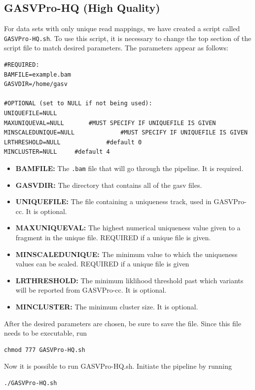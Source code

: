 \documentclass[11pt]{article}
\begin{document}
\subsection{GASVPro-HQ (High Quality)}
For data sets with only unique read mappings, we have created a script called \verb+GASVPro-HQ.sh+. To use this script, it is necessary to change the top section of the script file to match desired parameters. The parameters appear as follows: 
\begin{Verbatim}[frame=single]
#REQUIRED:
BAMFILE=example.bam
GASVDIR=/home/gasv

#OPTIONAL (set to NULL if not being used):
UNIQUEFILE=NULL
MAXUNIQUEVAL=NULL		#MUST SPECIFY IF UNIQUEFILE IS GIVEN
MINSCALEDUNIQUE=NULL             #MUST SPECIFY IF UNIQUEFILE IS GIVEN
LRTHRESHOLD=NULL	         #default 0
MINCLUSTER=NULL	  	#default 4
\end{Verbatim}
\begin{itemize}
\item {\bf BAMFILE:} The \verb+.bam+ file that will go through the pipeline. It is required.
\item {\bf GASVDIR:} The directory that contains all of the gasv files.
\item {\bf UNIQUEFILE:} The file containing a uniqueness track, used in GASVPro-cc. It is optional.
\item {\bf MAXUNIQUEVAL:} The highest numerical uniqueness value given to a fragment in the unique file. REQUIRED if a unique file is given.
\item {\bf MINSCALEDUNIQUE:} The minimum value to which the uniqueness values can be scaled. REQUIRED if a unique file is given
\item {\bf LRTHRESHOLD:} The minimum liklihood threshold past which variants will be reported from GASVPro-cc. It is optional.
\item {\bf MINCLUSTER: } The minimum cluster size. It is optional.
\end{itemize}

\noindent After the desired parameters are chosen, be sure to save the file. Since this file needs to be executable, run 
\begin{Verbatim}[frame=single]
chmod 777 GASVPro-HQ.sh
\end{Verbatim}
Now it is possible to run GASVPro-HQ.sh. Initiate the pipeline by running 
\begin{Verbatim}[frame=single]
./GASVPro-HQ.sh
\end{Verbatim}
\end{document}
